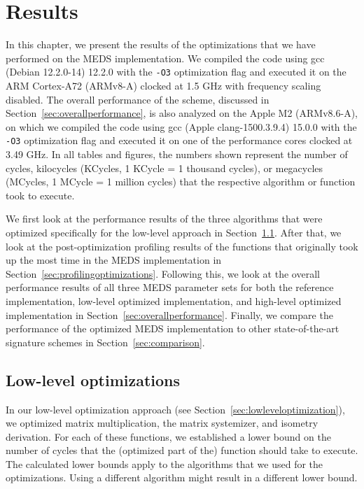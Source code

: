 \documentclass[11pt,a4paper]{report}
\theoremstyle{definition}
\begin{document}
\chapter{Results}
\label{ch:results}
In this chapter, we present the results of the optimizations that we have performed on the MEDS implementation. We compiled the code using gcc (Debian 12.2.0-14) 12.2.0 with the \texttt{-O3} optimization flag and executed it on the ARM Cortex-A72 (ARMv8-A) clocked at 1.5 GHz with frequency scaling disabled. The overall performance of the scheme, discussed in Section~\ref{sec:overallperformance}, is also analyzed on the Apple M2 (ARMv8.6-A), on which we compiled the code using gcc (Apple clang-1500.3.9.4) 15.0.0 with the \texttt{-O3} optimization flag and executed it on one of the performance cores clocked at 3.49 GHz. In all tables and figures, the numbers shown represent the number of cycles, kilocycles (KCycles, 1 KCycle = 1 thousand cycles), or megacycles (MCycles, 1 MCycle = 1 million cycles) that the respective algorithm or function took to execute.

We first look at the performance results of the three algorithms that were optimized specifically for the low-level approach in Section~\ref{sec:resultslowlevel}. After that, we look at the post-optimization profiling results of the functions that originally took up the most time in the MEDS implementation in Section~\ref{sec:profilingoptimizations}. Following this, we look at the overall performance results of all three MEDS parameter sets for both the reference implementation, low-level optimized implementation, and high-level optimized implementation in Section~\ref{sec:overallperformance}. Finally, we compare the performance of the optimized MEDS implementation to other state-of-the-art signature schemes in Section~\ref{sec:comparison}.

\section{Low-level optimizations}
\label{sec:resultslowlevel}
In our low-level optimization approach (see Section~\ref{sec:lowleveloptimization}), we optimized matrix multiplication, the matrix systemizer, and isometry derivation. For each of these functions, we established a lower bound on the number of cycles that the (optimized part of the) function should take to execute. The calculated lower bounds apply to the algorithms that we used for the optimizations. Using a different algorithm might result in a different lower bound.
\end{document}
